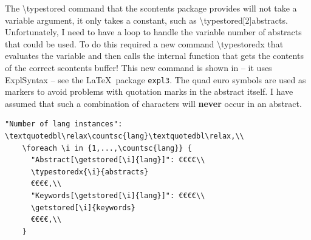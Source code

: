The \textbackslash typestored command that the scontents package provides will not take a variable argument, \ie it only takes a constant, such as \textbackslash typestored[2]{abstracts}. Unfortunately, I need to have a loop to handle the variable number of abstracts that could be used. To do this required a new command \textbackslash typestoredx that evaluates the variable and then calls the internal function that gets the contents of the correct scontents buffer! This new command is shown in  – it uses ExplSyntax – see the \LaTeX~package \texttt{expl3}. The quad euro symbols are used as markers to avoid problems with quotation marks in the abstract itself. I have assumed that such a combination of characters will \textbf{never} occur in an abstract.
\begin{lstlisting}[language={[LaTeX]TeX}, caption={Code in \textbackslash divainfo command to output the abstracts and keywords }, label=lst:languages] 
    "Number of lang instances": \textquotedbl\relax\countsc{lang}\textquotedbl\relax,\\
    \foreach \i in {1,...,\countsc{lang}} {
      "Abstract[\getstored[\i]{lang}]": €€€€\\
      \typestoredx{\i}{abstracts}
      €€€€,\\
      "Keywords[\getstored[\i]{lang}]": €€€€\\
      \getstored[\i]{keywords}
      €€€€,\\
    }
\end{lstlisting}

